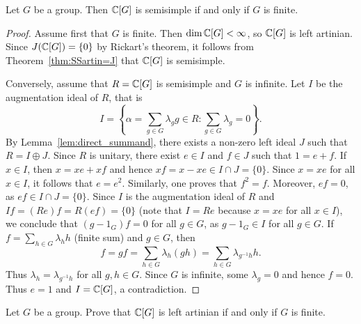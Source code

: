 
\begin{theorem}
	Let $G$ be a group. Then $\mathbb{C}[G]$ is 
	semisimple if and only if $G$ is finite. 
\end{theorem}

\begin{proof}
	Assume first that $G$ is finite. Then $\dim\mathbb{C}[G]<\infty$, so $\mathbb{C}[G]$ is left artinian. Since 
	$J(\mathbb{C}[G])=\{0\}$ by Rickart's theorem, 
	it follows from Theorem~\ref{thm:SSartin=J} that $\mathbb{C}[G]$ is semisimple. 

	Conversely, assume that $R=\mathbb{C}[G]$ is semisimple and $G$ is infinite. Let $I$ 
	be the augmentation ideal of $R$, that is
	\[
	I=\left\{\alpha=\sum_{g\in G}\lambda_gg\in R:\sum_{g\in G}\lambda_g=0\right\}.
	\]
	By Lemma~\ref{lem:direct_summand}, 
	there exists a non-zero left ideal $J$ such that 
	$R=I\oplus J$. Since $R$ is unitary, there exist $e\in I$ and $f\in J$ such that
	$1=e+f$. If
	$x\in I$, then $x=xe+xf$ and hence $xf=x-xe\in I\cap J=\{0\}$. Since 
	$x=xe$ for all $x\in I$, it follows that $e=e^2$. Similarly, one proves
	that $f^2=f$. Moreover, $ef=0$, as $ef\in I\cap J=\{0\}$.  Since $I$ 
	is the augmentation ideal of $R$ and $If=(Re)f=R(ef)=\{0\}$ 
 (note that $I=Re$ because $x=xe$ for all $x\in I$), we conclude that
	$(g-1_G)f=0$
	for all $g\in G$, as $g-1_G\in I$ for all $g\in G$. If $f=\sum_{h\in
	G}\lambda_hh$ (finite sum) and $g\in G$, then  
	\[
	f=gf=\sum_{h\in G}\lambda_h(gh)=\sum_{h\in
	G}\lambda_{g^{-1}h}h.
	\]
        Thus $\lambda_h=\lambda_{g^{-1}h}$ for all $g,h\in G$. Since $G$ 
	is infinite, some $\lambda_g=0$ and hence $f=0$. Thus $e=1$ and $I=\mathbb{C}[G]$, a contradiction. 
\end{proof}


\begin{exercise}
	Let $G$ be a group. Prove that 
	$\mathbb{C}[G]$ is left artinian if and only if $G$ is finite.
\end{exercise}


